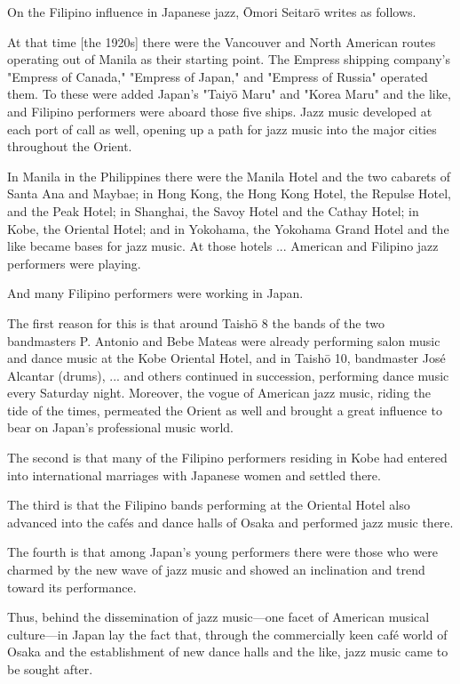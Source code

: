 On the Filipino influence in Japanese jazz, Ōmori Seitarō writes as follows.

At that time [the 1920s] there were the Vancouver and North American routes operating out of Manila as their starting point. The Empress shipping company's "Empress of Canada," "Empress of Japan," and "Empress of Russia" operated them. To these were added Japan's "Taiyō Maru" and "Korea Maru" and the like, and Filipino performers were aboard those five ships. Jazz music developed at each port of call as well, opening up a path for jazz music into the major cities throughout the Orient.

In Manila in the Philippines there were the Manila Hotel and the two cabarets of Santa Ana and Maybae; in Hong Kong, the Hong Kong Hotel, the Repulse Hotel, and the Peak Hotel; in Shanghai, the Savoy Hotel and the Cathay Hotel; in Kobe, the Oriental Hotel; and in Yokohama, the Yokohama Grand Hotel and the like became bases for jazz music. At those hotels ... American and Filipino jazz performers were playing.

And many Filipino performers were working in Japan.

The first reason for this is that around Taishō 8 the bands of the two bandmasters P. Antonio and Bebe Mateas were already performing salon music and dance music at the Kobe Oriental Hotel, and in Taishō 10, bandmaster José Alcantar (drums), ... and others continued in succession, performing dance music every Saturday night. Moreover, the vogue of American jazz music, riding the tide of the times, permeated the Orient as well and brought a great influence to bear on Japan's professional music world.

The second is that many of the Filipino performers residing in Kobe had entered into international marriages with Japanese women and settled there.

The third is that the Filipino bands performing at the Oriental Hotel also advanced into the cafés and dance halls of Osaka and performed jazz music there.

The fourth is that among Japan's young performers there were those who were charmed by the new wave of jazz music and showed an inclination and trend toward its performance.

Thus, behind the dissemination of jazz music—one facet of American musical culture—in Japan lay the fact that, through the commercially keen café world of Osaka and the establishment of new dance halls and the like, jazz music came to be sought after.


